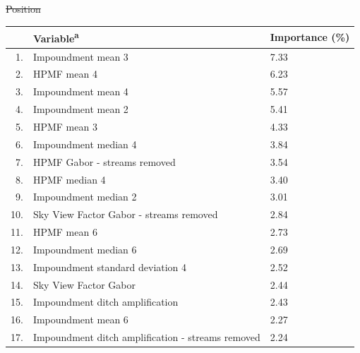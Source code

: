 \documentclass[11pt, review]{elsarticle} %
\providecommand{\DIFaddtex}[1]{{\protect\color{blue}\uwave{#1}}} %
\providecommand{\DIFdeltex}[1]{{\protect\color{red}\sout{#1}}}                      %
\providecommand{\DIFaddFL}[1]{\DIFadd{#1}} %
\providecommand{\DIFdelFL}[1]{\DIFdel{#1}} %
\providecommand{\DIFaddbeginFL}{} %
\providecommand{\DIFaddendFL}{} %
\providecommand{\DIFdelbeginFL}{} %
\providecommand{\DIFdelendFL}{} %
\providecommand{\DIFadd}[1]{\texorpdfstring{\DIFaddtex{#1}}{#1}} %
\providecommand{\DIFdel}[1]{\texorpdfstring{\DIFdeltex{#1}}{}} %
\begin{document}
\begin{table} [!htb]
\DIFdelbeginFL %
\DIFdelendFL \DIFaddbeginFL \centering
    \DIFaddendFL {\DIFdelbeginFL %
\DIFdelFL{Position }\DIFdelendFL \DIFaddbeginFL \begin{tabular}{r|ll}
      \DIFaddFL{Pos }\DIFaddendFL & Variable\textsuperscript{a} & Importance (\%) \\
      \DIFdelbeginFL %
\DIFdelendFL \DIFaddbeginFL \hline
      \DIFaddendFL 1.  & Impoundment mean 3                                  & 7.33\\
      2.  & HPMF mean 4                                         & 6.23\\
      3.  & Impoundment mean 4                                  & 5.57\\
      4.  & Impoundment mean 2                                  & 5.41\\
      5.  & HPMF mean 3                                         & 4.33\\
      6.  & Impoundment median 4                                & 3.84\\
      7.  & HPMF Gabor - streams removed                        & 3.54\\
      8.  & HPMF median 4                                       & 3.40\\
      9.  & Impoundment median 2                                & 3.01\\
      10. & Sky View Factor Gabor - streams removed             & 2.84\\
      11. & HPMF mean 6                                         & 2.73\\
      12. & Impoundment median 6                                & 2.69\\
      13. & Impoundment standard deviation 4                    & 2.52\\
      14. & Sky View Factor Gabor                               & 2.44\\
      15. & Impoundment ditch amplification                     & 2.43\\
      16. & Impoundment mean 6                                  & 2.27\\
      17. & Impoundment ditch amplification - streams removed   & 2.24\\

\end{tabular}}
\end{table}
\end{document}
